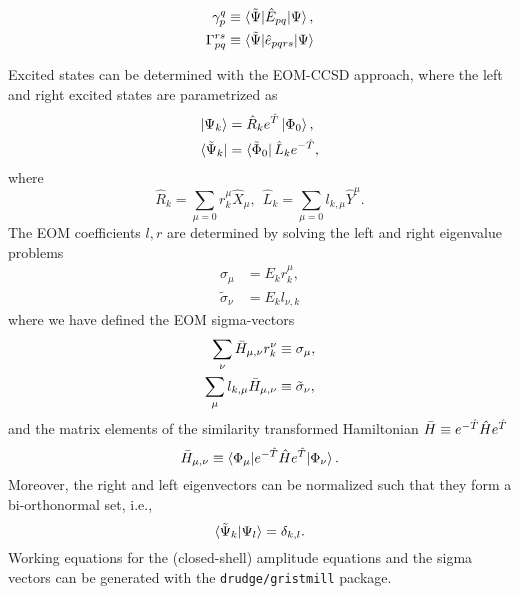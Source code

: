 \documentclass{article}
\begin{document}
\begin{align}
    \gamma_p^q &\equiv \braket{\tilde{\Psi}|\hat{E}_{pq}|\Psi}, \\
    \Gamma_{pq}^{rs} &\equiv \braket{\tilde{\Psi}|\hat{e}_{pqrs}|\Psi}
\end{align}

Excited states can be determined with the EOM-CCSD approach, where the left and right excited states are parametrized as 
\begin{align}
    \ket{\Psi_k} &= \hat{R}_k e^{\hat{T}} \ket{\Phi_0}, \\
    \bra{\tilde{\Psi}_k} &= \bra{\tilde{\Phi}_0}\hat{L}_ke^{-\hat{T}},
\end{align}
where 
\begin{equation}
    \hat{R}_k = \sum_{\mu=0} r_k^\mu \hat{X}_\mu, \ \ \hat{L}_k = \sum_{\mu=0} l_{k,\mu} \hat{Y}^\mu.
\end{equation}
The EOM coefficients $l, r$ are determined by solving the left and right eigenvalue problems
\begin{align}
    \sigma_\mu &=  E_k r^\mu_k, \\
    \tilde{\sigma}_\nu &= E_k l_{\nu,k} 
\end{align}
where we have defined the EOM sigma-vectors
\begin{align}
     \sum_{\nu} \Bar{H}_{\mu,\nu} r^\nu_k &\equiv \sigma_\mu \label{sigma-EOM},\\
   \sum_{\mu} l_{k,\mu}\Bar{H}_{\mu,\nu} &\equiv \tilde{\sigma}_\nu \label{tilde-sigma-EOM},
\end{align}
and the matrix elements of the similarity transformed Hamiltonian $\Bar{H} \equiv e^{-\hat{T}}\hat{H}e^{\hat{T}}$
\begin{equation}
    \Bar{H}_{\mu, \nu} \equiv \braket{\Phi_\mu|e^{-\hat{T}}\hat{H}e^{\hat{T}}|\Phi_\nu}.
\end{equation}
Moreover, the right and left eigenvectors can be normalized such that they form a bi-orthonormal set, i.e., 
\begin{equation}
    \braket{\tilde{\Psi}_k|\Psi_l} = \delta_{k,l}.
\end{equation}
Working equations for the (closed-shell) amplitude equations and the sigma vectors can be generated with the \texttt{drudge/gristmill} package.

\begin{appendix}

\end{appendix}
\printbibliography
\end{document}
